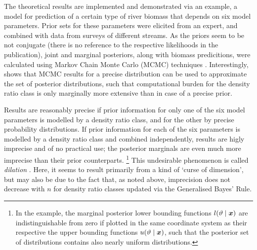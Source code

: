 The theoretical results are implemented and demonstrated via an example,
a model for prediction of a certain type of river biomass that depends on six model parameters.
Prior sets for these parameters were elicited from an expert,
and combined with data from surveys of different streams.
As the priors seem to be not conjugate (there is no reference to the respective likelihoods in the publication),
joint and marginal posteriors, along with biomass predicitions, were calculated using
Markov Chain Monte Carlo (MCMC) techniques \parencite[see, e.g.,][]{1998:gilks}.
Interestingly, \textcite[\S 4.3]{2011:rinderknecht:diss} shows that
MCMC results for a precise distribution can be used to approximate the set of posterior distributions,
such that computational burden for the density ratio class is only marginally more extensive than in case of a precise prior.

Results are reasonably precise if prior information for only one of the six model parameters
is modelled by a density ratio class, and for the other by precise probability distributions.
If prior information for each of the six parameters is modelled by a density ratio class and combined independently,
results are higly imprecise and of no practical use;
the posterior marginals are even much more imprecise than their prior counterparts.%
\footnote{In the example, the marginal posterior lower bounding functions $l(\vartheta\mid{\bm x})$ are indistinguishable
from zero if plotted in the same coordinate system as their respective the upper bounding functions $u(\vartheta\mid{\bm x})$,
such that the posterior set of distributions contains also nearly uniform distributions.}
This undesirable phenomenon is called \emph{dilation} \parencite[see][]{1993:seidenfeld}.
Here, it seems to result primarily from a kind of `curse of dimension',
but may also be due to the fact that, as noted above, imprecision does not decrease with $n$
for density ratio classes updated via the Generalised Bayes' Rule.

